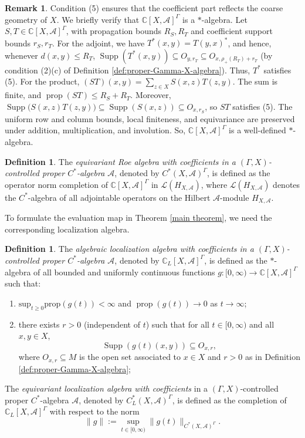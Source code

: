 \documentclass[pdflatex]{sn-jnl}
\theoremstyle{plain}
\theoremstyle{definition}
\newtheorem{definition}[theorem]{Definition}
\newtheorem{remark}[theorem]{Remark}
\begin{document}
\begin{remark}\label{rem:closure-algebra}
Condition (5) ensures that the coefficient part reflects the coarse geometry of $X$. We briefly verify that
$\mathbb{C}[X,\mathcal{A}]^\Gamma$ is a $*$-algebra.
Let $S,T\in\mathbb{C}[X,\mathcal{A}]^\Gamma$, with propagation bounds
$R_S,R_T$ and coefficient support bounds $r_S,r_T$. For the adjoint, we have
$T^{*}(x,y)=T(y,x)^{*}$,
and hence, whenever $d(x,y)\leq R_T$,
$\operatorname{Supp}(T^*(x,y))
\subseteq O_{y,r_T}
\subseteq O_{x,\rho_+(R_T)+r_T}$
(by condition (2)(c) of
Definition \ref{def:proper-Gamma-X-algebra}). Thus, $T^{*}$ satisfies
(5).
For the product,
$(ST)(x,y)=\sum_{z\in X}S(x,z)T(z,y)$.
The sum is finite, and
$\operatorname{prop}(ST)\leq R_S+R_T$.
Moreover,
$\operatorname{Supp}\bigl(S(x,z)T(z,y)\bigr)
\subseteq
\operatorname{Supp}(S(x,z))
\subseteq O_{x,r_S}$,
so $ST$ satisfies  (5). The uniform row and column
bounds, local finiteness, and equivariance are preserved under
addition, multiplication, and involution. So,
$\mathbb{C}[X,\mathcal{A}]^\Gamma$ is a well-defined $*$-algebra.
\end{remark}
\begin{definition}\label{def:equiv-roe-X}
The \emph{equivariant Roe algebra with coefficients in a $(\Gamma, X)$-controlled proper $C^{*}$-algebra $\mathcal{A}$}, denoted by $C^{*}(X,\mathcal{A})^{\Gamma}$, is defined as the operator norm completion of $\mathbb{C}[X,\mathcal{A}]^{\Gamma}$ in $\mathcal{L}(H_{X,\mathcal{A}})$, where $\mathcal{L}(H_{X,\mathcal{A}})$ denotes the $C^{*}$-algebra of all adjointable operators on the Hilbert $\mathcal{A}$-module $H_{X,\mathcal{A}}$.
\end{definition}
To formulate the evaluation map in Theorem \ref{main theorem}, we need the corresponding localization algebra. 
\begin{definition}\label{def:equiv-alg-loc-X}
The \emph{algebraic localization algebra with coefficients in a $(\Gamma, X)$-controlled proper $C^{*}$-algebra $\mathcal{A}$}, denoted by $\mathbb{C}_L[X,\mathcal{A}]^{\Gamma}$, is defined as the $*$-algebra of all bounded and uniformly continuous functions $g\colon [0,\infty)\to\mathbb{C}[X,\mathcal{A}]^{\Gamma}$ such that:
\begin{enumerate}
\item[(1)] $\text{sup}_{t\geq 0}\text{prop}(g(t))<\infty$ and $\operatorname{prop}(g(t))\to 0$ as $t\to \infty$;
\item[(2)] there exists $r>0$ (independent of $t$) such that for all $t\in [0,\infty)$ and all $x, y\in X$, $$\operatorname{Supp}(g(t)(x,y))\subseteq O_{x,r},$$ where $O_{x,r}\subseteq M$ is the open set associated to $x\in X$ and $r>0$ as in Definition \ref{def:proper-Gamma-X-algebra};
\end{enumerate}
The \emph{equivariant localization algebra with coefficients} in a $(\Gamma, X)$-controlled proper $C^{*}$-algebra $\mathcal{A}$, denoted by $C^{*}_L(X,\mathcal{A})^{\Gamma}$, is defined as the completion of $\mathbb{C}_L[X,\mathcal{A}]^{\Gamma}$ with respect to the norm
\[\|g\|:=\sup_{t\in [0,\infty)}\|g(t)\|_{C^{*}(X,\mathcal{A})^{\Gamma}}.\]
\end{definition}
\end{document}
